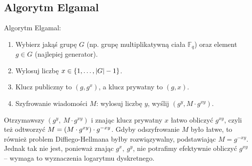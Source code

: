 \subsection{Algorytm Elgamal}
\begin{greyframe}
    Algorytm Elgamal:
    \begin{enumerate}
        \item Wybierz jakąś grupę \( G \) (np. grupę multiplikatywną ciała \( \mathbb{F}_q \)) oraz element \( g \in G \) (najlepiej generator).
        \item Wylosuj liczbę \( x \in \set{1, \ldots, \abs{G}-1} \).
        \item Klucz publiczny to \( (g,g^x) \), a klucz prywatny to \( (g,x) \).
        \item Szyfrowanie wiadomości \( M \): wylosuj liczbę \( y \), wyślij \( (g^y, M \cdot g^{xy}) \). 
    \end{enumerate}
\end{greyframe}
Otrzymawszy \( (g^y, \ M \cdot g^{xy}) \) i znając klucz prywatny \( x \) łatwo obliczyć \( g^{xy} \), czyli też odtworzyć \( M = \left(M \cdot g^{xy}\right) \cdot g^{-xy} \).
Gdyby odszyfrowanie \( M \) było łatwe, to również problem Diffiego-Hellmana byłby rozwiązywalny, podstawiając \( M = g^{-xy} \).
Jednak tak nie jest, ponieważ znając \( g^x, \ g^y \), nie potrafimy efektywnie obliczyć \( g^{xy} \) -- wymaga to wyznaczenia logarytmu dyskretnego.